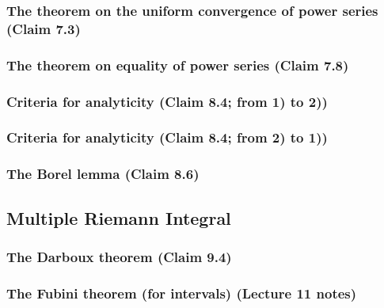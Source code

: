 \subsubsection{The theorem on the uniform convergence of power series (Claim 7.3)}
\subsubsection{The theorem on equality of power series (Claim 7.8)}
\subsubsection{Criteria for analyticity (Claim 8.4; from 1) to 2))}
\subsubsection{Criteria for analyticity (Claim 8.4; from 2) to 1))}
\subsubsection{The Borel lemma (Claim 8.6)}

\clearpage

\subsection{Multiple Riemann Integral}
\subsubsection{The Darboux theorem (Claim 9.4)}
\subsubsection{The Fubini theorem (for intervals) (Lecture 11 notes)}

\clearpage